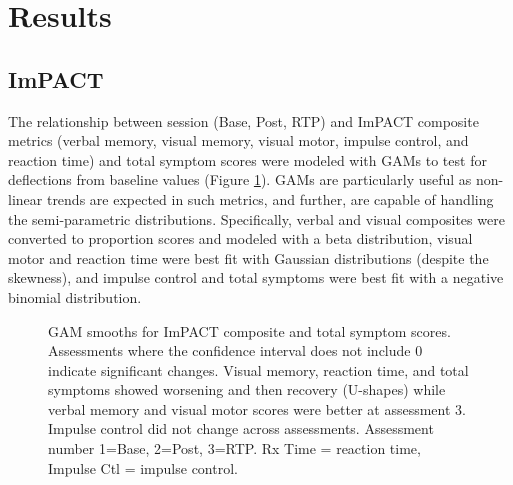 \documentclass[12pt]{article}
\begin{document}


\section{Results}
\label{sec:res}

\subsection{ImPACT}
\label{ssec:res-imp}


The relationship between session (Base, Post, RTP) and ImPACT composite metrics (verbal memory, visual memory, visual motor, impulse control, and reaction time) and total symptom scores were modeled with GAMs to test for deflections from baseline values (Figure \ref{fig:imp-gam}). GAMs are particularly useful as non-linear trends are expected in such metrics, and further, are capable of handling the semi-parametric distributions. Specifically, verbal and visual composites were converted to proportion scores and modeled with a beta distribution, visual motor and reaction time were best fit with Gaussian distributions (despite the skewness), and impulse control and total symptoms were best fit with a negative binomial distribution.

\begin{figure}[H]
	\centering
	\caption{GAM smooths for ImPACT composite and total symptom scores. Assessments where the confidence interval does not include 0 indicate significant changes. Visual memory, reaction time, and total symptoms showed worsening and then recovery (U-shapes) while verbal memory and visual motor scores were better at assessment 3. Impulse control did not change across assessments. Assessment number 1=Base, 2=Post, 3=RTP. Rx Time = reaction time, Impulse Ctl = impulse control.}
	\label{fig:imp-gam}
\end{figure}
\end{document}

